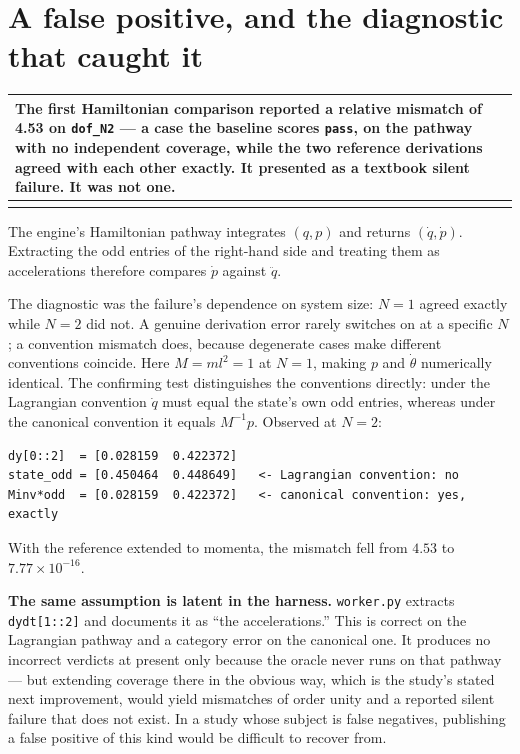 \documentclass[11pt,a4paper]{article}
\makeatletter
\newenvironment{callout}
  {\par\medskip\noindent\begin{tabular}{@{}p{0.94\textwidth}@{}}
   \arrayrulecolor{warnrule}\hline\rule{0pt}{2.6ex}}
  {\\[0.8ex]\hline\arrayrulecolor{black}\end{tabular}\par\medskip}
\makeatother
\begin{document}
\section{A false positive, and the diagnostic that caught it}\label{sec:falsepos}

\begin{callout}
The first Hamiltonian comparison reported a relative mismatch of \textbf{4.53}
on \texttt{dof\_N2} --- a case the baseline scores \texttt{pass}, on the
pathway with no independent coverage, while the two reference derivations
agreed with each other exactly. It presented as a textbook silent failure. It
was not one.
\end{callout}

The engine's Hamiltonian pathway integrates $(q,p)$ and returns
$(\dot q, \dot p)$. Extracting the odd entries of the right-hand side and
treating them as accelerations therefore compares $\dot p$ against $\ddot q$.

The diagnostic was the failure's dependence on system size: $N=1$ agreed
exactly while $N=2$ did not. A genuine derivation error rarely switches on at a
specific $N$; a convention mismatch does, because degenerate cases make
different conventions coincide. Here $M = ml^{2} = 1$ at $N=1$, making $p$ and
$\dot\theta$ numerically identical. The confirming test distinguishes the
conventions directly: under the Lagrangian convention $\dot q$ must equal the
state's own odd entries, whereas under the canonical convention it equals
$M^{-1}p$. Observed at $N=2$:

\begin{lstlisting}
dy[0::2]  = [0.028159  0.422372]
state_odd = [0.450464  0.448649]   <- Lagrangian convention: no
Minv*odd  = [0.028159  0.422372]   <- canonical convention: yes, exactly
\end{lstlisting}

With the reference extended to momenta, the mismatch fell from $4.53$ to
$7.77\times10^{-16}$.

\medskip
\noindent\textbf{The same assumption is latent in the harness.}
\texttt{worker.py} extracts \texttt{dydt[1::2]} and documents it as ``the
accelerations.'' This is correct on the Lagrangian pathway and a category error
on the canonical one. It produces no incorrect verdicts at present only because
the oracle never runs on that pathway --- but extending coverage there in the
obvious way, which is the study's stated next improvement, would yield
mismatches of order unity and a reported silent failure that does not exist. In
a study whose subject is false negatives, publishing a false positive of this
kind would be difficult to recover from.
\end{document}
